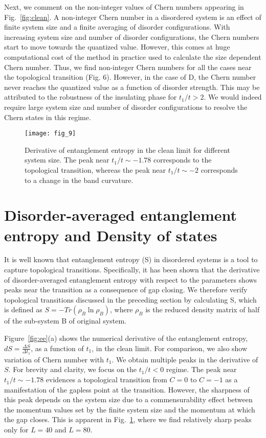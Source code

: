 \documentclass[aps,prb,showpacs,twocolumn,floats]{revtex4-1}
\begin{document}
Next, we comment on the non-integer values of Chern numbers appearing in Fig.~\ref{fig:clean}. A non-integer Chern number in a disordered system is an effect of finite system size and a finite averaging of disorder configurations. With increasing system size and number of disorder configurations, the Chern numbers start to move towards the quantized value. However, this comes at huge computational cost of the method in practice used to calculate the size dependent Chern number. Thus, we find non-integer Chern numbers for all the cases near the topological transition (Fig. 6). However, in the case of D, the Chern number never reaches the quantized value as a function of disorder strength. This may be attributed to the robustness of the insulating phase for $t_1/t>2$. We would indeed require large system size and number of disorder configurations to resolve the Chern states in this regime.

\begin{figure}
\texttt{[image: fig\_9]}
\caption{Derivative of entanglement entropy in the clean limit for different system size. 
The peak near $t_1/t\sim -1.78$ corresponds to the topological transition, whereas the peak near $t_1/t\sim -2 $ corresponds to a change in 
the band curvature.}
\label{fig:entropyL}
\end{figure}


\section{Disorder-averaged entanglement entropy and Density of states}
It is well known that entanglement entropy (S) in disordered systems is a tool to capture topological transitions. Specifically, it has been shown that the derivative of disorder-averaged entanglement entropy \cite{tami,tami1,huges1,huges2,vojta,pour} with respect to the parameters shows peaks near the transition as a consequence of gap closing. 
We therefore verify topological transitions discussed in the preceding section by calculating S, which is defined as $S =  -Tr(\rho_B \ln \rho_B)$, where $\rho_B$ is the reduced density matrix of half of the sub-system B of original system. 

Figure~\ref{fig:ee}(a) shows the numerical derivative of the entanglement entropy, $dS = \frac{\Delta S}{\Delta t_1}$, as a function of $t_1$, in the clean limit. For comparison, we also show variation of Chern number with $t_1$. We obtain multiple peaks in the derivative of $S$. For brevity and clarity, we focus on the $t_1/t<0$ regime. The peak near $t_1/t\sim -1.78$ evidences a topological transition from $C=0$ to $C=-1$ as a manifestation of the gapless point at the transition. However, the sharpness of this peak depends on the system size due to a commensurability effect between the momentum values set by the finite system size and the momentum at which the gap closes. This is apparent in Fig.~\ref{fig:entropyL}, where we find relatively sharp peaks only for $L=40$ and $L=80$. 
\end{document}
